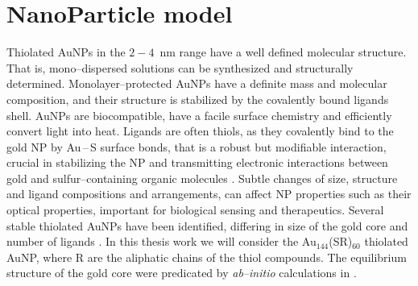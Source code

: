 \section{NanoParticle model}
Thiolated \acp{AuNP} in the $2-4$~nm range have a well defined molecular structure. That is, 
mono--dispersed solutions can be synthesized and structurally determined. Monolayer--protected 
\acp{AuNP} have a definite mass and molecular composition, and their structure is stabilized by the covalently 
bound ligands shell. \acp{AuNP} are biocompatible, have a facile surface chemistry and efficiently convert light 
into heat. Ligands are often thiols, as they covalently bind to the gold \ac{NP} by Au\,--\,S surface bonds, that 
is a robust but modifiable interaction, crucial in stabilizing the \ac{NP} and transmitting electronic 
interactions between gold and sulfur--containing organic molecules \cite{corePassivated}. Subtle changes of size, 
structure and ligand compositions and arrangements, can affect \ac{NP} properties such as their optical 
properties, important for biological sensing and therapeutics. Several stable thiolated \acp{AuNP} have been 
identified, differing in size of the gold core and number of ligands \cite{corePassivated}. In this thesis work 
we will consider the {Au$_{144}$(SR)$_{60}$} thiolated \ac{AuNP}, where R are the aliphatic chains of the thiol 
compounds. The equilibrium structure of the gold core were predicated by \textit{ab--initio} calculations in 
\cite{clusterEquilibrium}. 


